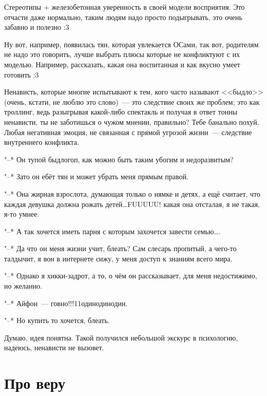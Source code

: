 \documentclass[a4paper,14pt,oneside]{memoir}
\begin{document}
Стереотипы + железобетонная уверенность в своей модели восприятия. Это отчасти даже нормально, таким людям надо просто подыгрывать, это очень забавно и полезно :3 

Ну вот, например, появилась тян, которая увлекается ОСами, так вот, родителям не надо это говорить, лучше выбрать плюсы которые не конфликтуют с их моделью. Например, рассказать, какая она воспитанная и как вкусно умеет готовить :3 

Ненависть, которые многие испытывают к тем, кого часто называют <<быдло>> (очень, кстати, не люблю это слово)~--- это следствие своих же проблем; это как троллинг, ведь разыгрывая какой-либо спектакль и получая в ответ тонны ненависти, ты не заботишься о чужом мнении, правильно? Тебе банально похуй. Любая негативная эмоция, не связанная с прямой угрозой жизни~--- следствие внутреннего конфликта. 

\medskip

"--* Он тупой быдлогоп, как можно быть таким убогим и недоразвитым? 

"--* Зато он ебёт тян и может убрать меня прямым правой.

\medskip

"--* Она жирная взрослота, думающая только о нямке и детях, а ещё считает, что каждая девушка должна рожать детей\ldots FUUUUU! какая она отсталая, я не такая, я-то умнее.

"--* А так хочется иметь парня с которым захочется завести семью\ldots. %

\medskip

"--* Да что он меня жизни учит, блеать? Сам слесарь пропитый, а чего-то талдычит, я вон в интернете сижу, у меня доступ к знаниям всего мира.

"--* Однако я хикки-задрот, а то, о чём он рассказывает, для меня недостижимо, но желанно.

\medskip

"--* Айфон~--- говно!!!11одинодинодин. 

"--* Но купить то хочется, блеать. 

\medskip

Думаю, идея понятна. Такой получился небольшой экскурс в психологию, надеюсь, ненависти не вызовет. %




\section{Про веру} 
\end{document}
